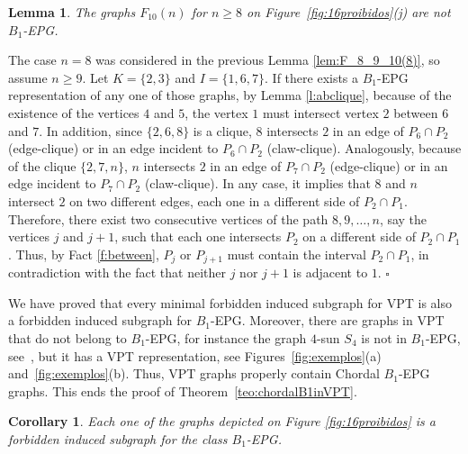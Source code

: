 \documentclass[9pt]{entcs}
\newtheorem{lema}[thm]{Lemma}%
\newtheorem{coro}[thm]{Corollary}%
\newcommand{\la}[1]{\textcolor{blue}{\sf{#1}}}%
\newcommand{\tanilson}[1]{\textcolor{auburn}{\sf{#1}}}%
\begin{document}
  \begin{lema}\label{lem:F_10(n)}
The graphs  $F_{10}(n)$ for $n \geq 8$ on Figure~\ref{fig:16proibidos}(j) are not   $B_1$-EPG.
\end{lema}
\begin{pf} The case $n=8$ was considered  in the previous Lemma \ref{lem:F_8_9_10(8)}, so assume $n\geq 9$.   Let $K=\{2,3\}$ and $I=\{1,6,7\}$. If there exists a $B_1$-EPG representation of any one of those graphs,  by Lemma \ref{l:abclique},  because of the existence of the vertices  $4$ and $5$, the vertex $1$ must intersect  vertex $2$ between $6$ and $7$. In addition, since $\{2,6,8\}$ is a clique, $8$ intersects $2$ in an edge of $P_6\cap P_2$ (edge-clique) or in an edge incident to $P_6\cap P_2$ (claw-clique). Analogously, because of the clique $\{2,7,n\}$,  $n$ intersects $2$ in an edge of $P_7\cap P_2$ (edge-clique) or in an edge incident to $P_7\cap P_2$ (claw-clique). In any case, it implies that $8$  and $n$ intersect $2$ on two different edges, each one in a different side of $P_2 \cap P_1$. Therefore, there exist two consecutive vertices of the path $8, 9, \ldots, n$, say the vertices $j$ and $j+1$, such that each one intersects $P_2$ on a different side of $P_2 \cap P_1$. Thus, by Fact \ref{f:between}, $P_j$ or $P_{j+1}$ must contain the interval  $P_2 \cap P_1$, in contradiction with the fact that neither $j$ nor $j+1$ is adjacent to $1$.
 \hfill $\square$\end{pf} 











%



We have proved that every minimal forbidden induced subgraph for VPT is also a  forbidden induced subgraph for \tanilson{Chordal} $B_1$-EPG. Moreover, there are graphs in VPT that do not belong to $B_1$-EPG, for instance the graph $4$-sun $S_4$ is not in $B_1$-EPG, see~\cite{golumbic2009}, but it has a VPT representation, see Figures~\ref{fig:exemplos}(a) and~\ref{fig:exemplos}(b). Thus, VPT graphs  properly contain Chordal $B_1$-EPG graphs. This ends the proof of Theorem~\ref{teo:chordalB1inVPT}. 
  
  \begin{coro}\label{c:prohib}
  Each one of the graphs depicted on Figure \ref{fig:16proibidos} is a forbidden induced subgraph for the class $B_1$-EPG.
  \end{coro}
  
\end{document}
